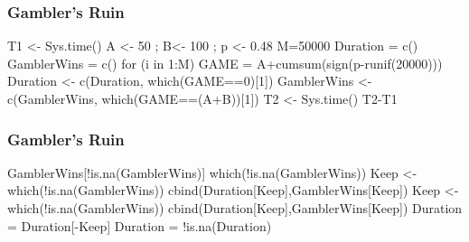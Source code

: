 \begin{frame}
	\frametitle{Gambler's Ruin}
T1 <- Sys.time()
A <- 50 ; B<- 100 ; p <- 0.48
M=50000
Duration = c()
GamblerWins = c()
for (i in 1:M)
{
	GAME = A+cumsum(sign(p-runif(20000)))
	Duration <- c(Duration, which(GAME==0)[1])
	GamblerWins <- c(GamblerWins, which(GAME==(A+B))[1])
}
T2 <- Sys.time()
T2-T1

\end{frame}
\begin{frame}
	\frametitle{Gambler's Ruin}

GamblerWins[!is.na(GamblerWins)]
which(!is.na(GamblerWins))
Keep <- which(!is.na(GamblerWins))
cbind(Duration[Keep],GamblerWins[Keep])
Keep <- which(!is.na(GamblerWins))
cbind(Duration[Keep],GamblerWins[Keep])
Duration = Duration[-Keep]
Duration = !is.na(Duration)


\end{frame}



